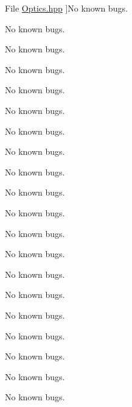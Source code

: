 \begin{DoxyRefList}
File \hyperlink{_optics_8hpp}{Optics.hpp} ]No known bugs.  
\item[\label{bug__bug000024}%
\Hypertarget{bug__bug000024}%
File \hyperlink{_optics_constants_8hpp}{Optics\+Constants.hpp} ]No known bugs.  
\item[\label{bug__bug000011}%
\Hypertarget{bug__bug000011}%
File \hyperlink{_orbital_charecteristics_8hpp}{Orbital\+Charecteristics.hpp} ]No known bugs.  
\item[\label{bug__bug000012}%
\Hypertarget{bug__bug000012}%
File \hyperlink{_orbital_charecteristics_8inl}{Orbital\+Charecteristics.inl} ]No known bugs.  
\item[\label{bug__bug000007}%
\Hypertarget{bug__bug000007}%
File \hyperlink{_periapsis_8hpp}{Periapsis.hpp} ]No known bugs. 

No known bugs.  
\item[\label{bug__bug000008}%
\Hypertarget{bug__bug000008}%
File \hyperlink{_periapsis_8inl}{Periapsis.inl} ]No known bugs. 

No known bugs.  
\item[\label{bug__bug000015}%
\Hypertarget{bug__bug000015}%
File \hyperlink{_planet_criteria_8hpp}{Planet\+Criteria.hpp} ]No known bugs.  
\item[\label{bug__bug000016}%
\Hypertarget{bug__bug000016}%
File \hyperlink{_planet_criteria_8inl}{Planet\+Criteria.inl} ]No known bugs.  
\item[\label{bug__bug000027}%
\Hypertarget{bug__bug000027}%
File \hyperlink{_plasma_8hpp}{Plasma.hpp} ]No known bugs.  
\item[\label{bug__bug000028}%
\Hypertarget{bug__bug000028}%
File \hyperlink{_plasma_constants_8hpp}{Plasma\+Constants.hpp} ]No known bugs.  
\item[\label{bug__bug000029}%
\Hypertarget{bug__bug000029}%
File \hyperlink{_quantum_8hpp}{Quantum.hpp} ]No known bugs.  
\item[\label{bug__bug000030}%
\Hypertarget{bug__bug000030}%
File \hyperlink{_quantum_constants_8hpp}{Quantum\+Constants.hpp} ]No known bugs.  
\item[\label{bug__bug000025}%
\Hypertarget{bug__bug000025}%
File \hyperlink{_redshift_8hpp}{Redshift.hpp} ]No known bugs.  
\item[\label{bug__bug000026}%
\Hypertarget{bug__bug000026}%
File \hyperlink{_redshift_8inl}{Redshift.inl} ]No known bugs.  
\item[\label{bug__bug000031}%
\Hypertarget{bug__bug000031}%
File \hyperlink{_relativity_8hpp}{Relativity.hpp} ]No known bugs.  
\item[\label{bug__bug000032}%
\Hypertarget{bug__bug000032}%
File \hyperlink{_relativity_constants_8hpp}{Relativity\+Constants.hpp} ]No known bugs.  
\item[\label{bug__bug000033}%
\Hypertarget{bug__bug000033}%
File \hyperlink{_thermodynamics_8hpp}{Thermodynamics.hpp} ]No known bugs.  
\item[\label{bug__bug000034}%
\Hypertarget{bug__bug000034}%
File \hyperlink{_thermodynamics_constants_8hpp}{Thermodynamics\+Constants.hpp} ]No known bugs. 
\end{DoxyRefList}